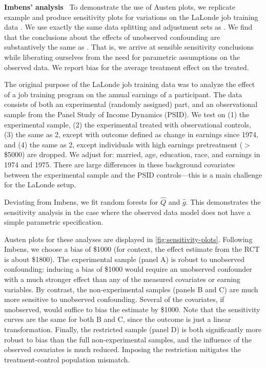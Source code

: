 \documentclass{article}
\DeclareRobustCommand{\parhead}[1]{\textbf{#1}~}
\begin{document}
\parhead{Imbens' analysis}%
To demonstrate the use of Austen plots, we replicate \citet{Imbens:2003} example and produce sensitivity plots for
variations on the LaLonde job training data \cite{LaLonde:1986}.
We use exactly the same data splitting and adjustment sets as \citet{Imbens:2003}.
We find that the conclusions about the effects of unobserved confounding are substantively the same as \citet{Imbens:2003}.
That is, we arrive at sensible sensitivity conclusions while liberating ourselves from the need for
parametric assumptions on the observed data. We report bias for the average treatment effect on the treated.


The original purpose of the LaLonde job training data was to analyze the effect of a job training program on the annual earnings of a participant.
The data consists of both an experimental (randomly assigned) part, and an observational sample from the Panel Study of
Income Dynamics (PSID).
We test on (1) the experimental sample, (2) the experimental treated with observational controls, (3) the same as 2, except with outcome defined as change in earnings since 1974, and (4) the same as 2, except individuals with high earnings pretreatment ($>$\$5000) are dropped.  
%
%
%
%
%
%
%
We adjust for: married, age, education, race, and earnings in 1974 and 1975. 
%
There are large differences in these background covariates between the experimental sample
and the PSID controls---this is a main challenge for the LaLonde setup.
%

Deviating from Imbens, we fit random forests for $\hat{Q}$ and $\hat{g}$. This demonstrates the sensitivity analysis
in the case where the observed data model does not have a simple parametric specification.
%
%
 
Austen plots for these analyses are displayed in \cref{fig:sensitivity-plots}.
Following Imbens, we choose a bias of \$1000 (for context, the effect estimate from the RCT is about \$1800).
The experimental sample (panel A) is robust to unobserved confounding:
inducing a bias of \$1000 would require an unobserved confounder with a much stronger
effect than any of the measured covariates or earning variables. 
By contrast, the non-experimental samples (panels B and C) are much more sensitive to unobserved confounding.
Several of the covariates, if unobserved, would suffice to bias the estimate by \$1000.
Note that the sensitivity curves are the same for both B and C, since the outcome is just a linear transformation.
Finally, the restricted sample (panel D) is both significantly more robust to bias than the
full non-experimental samples, and the influence of the observed covariates is much reduced.
Imposing the restriction mitigates the treatment-control population mismatch.
%
%
\end{document}
